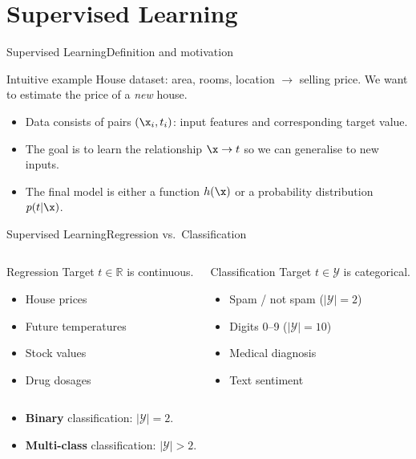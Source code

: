 \section{Supervised Learning}

\begin{frame}{Supervised Learning}{Definition and motivation}
  \begin{exampleblock}{Intuitive example}
    House dataset: area, rooms, location $\to$ selling price.
    We want to estimate the price of a \emph{new} house.
  \end{exampleblock}
  \bigskip
  \begin{itemize}
    \item Data consists of pairs $(\x_i, t_i)$: input features and corresponding target value.
    \item The goal is to learn the relationship $\x \to t$ so we can generalise to new inputs.
    \item The final model is either a function $h(\x)$ or a probability distribution
          $p(t|\x)$.
  \end{itemize}
\end{frame}

\begin{frame}{Supervised Learning}{Regression vs.\ Classification}
  \begin{columns}[T]
    \begin{block}{Regression}
      Target $t \in \mathbb{R}$ is continuous.
      \begin{itemize}
        \item House prices
        \item Future temperatures
        \item Stock values
        \item Drug dosages
      \end{itemize}
    \end{block}
    \begin{block}{Classification}
      Target $t \in \mathcal{Y}$ is categorical.
      \begin{itemize}
        \item Spam / not spam ($|\mathcal{Y}|=2$)
        \item Digits 0–9 ($|\mathcal{Y}|=10$)
        \item Medical diagnosis
        \item Text sentiment
      \end{itemize}
    \end{block}
  \end{columns}
  \bigskip
  \begin{itemize}
    \item \textcolor{AccentBlue}{\textbf{Binary}} classification: $|\mathcal{Y}| = 2$.
    \item \textcolor{AccentBlue}{\textbf{Multi-class}} classification: $|\mathcal{Y}| > 2$.
  \end{itemize}
\end{frame}

